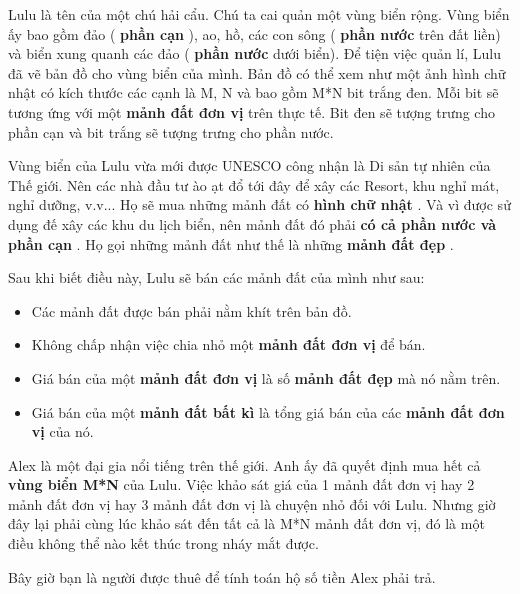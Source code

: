 Lulu là tên của một chú hải cẩu. Chú ta cai quản một vùng biển rộng. Vùng biển ấy bao gồm đảo (   \textbf{    phần cạn   }   ), ao, hồ, các con sông (   \textbf{    phần nước   }   trên đất liền) và biển xung quanh các đảo (   \textbf{    phần nước   }   dưới biển). Để tiện việc quản lí, Lulu đã vẽ bản đồ cho vùng biển của mình. Bản đồ có thể xem như một ảnh hình chữ nhật có kích thước các cạnh là M, N và bao gồm M*N bit trắng đen. Mỗi bit sẽ tương ứng với một   \textbf{    mảnh đất đơn vị   }   trên thực tế. Bit đen sẽ tượng trưng cho phần cạn và bit trắng sẽ tượng trưng cho phần nước.  

   Vùng biển của Lulu vừa mới được UNESCO công nhận là Di sản tự nhiên của Thế giới. Nên các nhà đầu tư ào ạt đổ tới đây để xây các Resort, khu nghỉ mát, nghỉ dưỡng, v.v... Họ sẽ mua những mảnh đất có   \textbf{    hình chữ nhật   }   . Và vì được sử dụng đế xây các khu du lịch biển, nên mảnh đất đó phải   \textbf{    có cả phần nước và phần cạn   }   . Họ gọi những mảnh đất như thế là   \textbf{}   những   \textbf{    mảnh đất đẹp   }   .  

   Sau khi biết điều này, Lulu sẽ bán các mảnh đất của mình như sau:  
\begin{itemize}
	\item     Các mảnh đất được bán phải nằm    khít    trên bản đồ.   
	\item     Không chấp nhận việc chia nhỏ một    \textbf{     mảnh đất đơn vị    }    để bán.   
	\item     Giá bán của một    \textbf{     mảnh đất đơn vị    }    là số    \textbf{     mảnh đất đẹp    }    mà nó nằm trên.   
	\item     Giá bán của một    \textbf{     mảnh đất bất kì    }    là tổng giá bán của các    \textbf{     mảnh đất đơn vị    }    của nó.   
\end{itemize}

   Alex là một đại gia nổi tiếng trên thế giới. Anh ấy đã quyết định mua hết cả   \textbf{    vùng biển M*N   }   của Lulu. Việc khảo sát giá của 1 mảnh đất đơn vị hay 2 mảnh đất đơn vị hay 3 mảnh đất đơn vị là chuyện nhỏ đối với Lulu. Nhưng giờ đây lại phải cùng lúc khảo sát đến tất cả là M*N mảnh đất đơn vị, đó là một điều không thể nào kết thúc trong nháy mắt được.  

   Bây giờ bạn là người được thuê để tính toán hộ số tiền Alex phải trả.  
\begin{itemize}
\end{itemize}